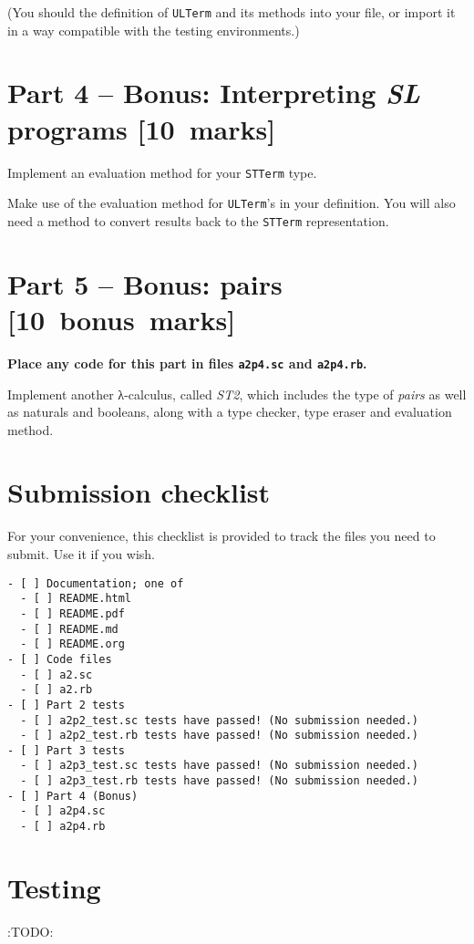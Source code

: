 \documentclass[11pt]{article}
\theoremstyle{definition}
\begin{document}
(You should the definition of \texttt{ULTerm} and its methods into your file,
or import it in a way compatible with the testing environments.)

\section*{Part 4 – Bonus: Interpreting \emph{SL} programs                     [10 marks]}
\label{sec:org5a3e0fd}
Implement an evaluation method for your \texttt{STTerm} type.

Make use of the evaluation method for \texttt{ULTerm}'s in your definition.
You will also need a method to convert results back
to the \texttt{STTerm} representation.

\section*{Part 5 – Bonus: pairs                                        [10 bonus marks]}
\label{sec:org3546d7a}
\begin{center}
\textbf{Place any code for this part in files \texttt{a2p4.sc} and \texttt{a2p4.rb}.}
\end{center}

Implement another λ-calculus, called \emph{ST2}, which includes
the type of \emph{pairs} as well as naturals and booleans,
along with a type checker, type eraser and evaluation method.

\section*{Submission checklist}
\label{sec:orgcb13380}
For your convenience, this checklist is provided
to track the files you need to submit.
Use it if you wish.
\begin{verbatim}
- [ ] Documentation; one of
  - [ ] README.html
  - [ ] README.pdf
  - [ ] README.md
  - [ ] README.org
- [ ] Code files
  - [ ] a2.sc
  - [ ] a2.rb
- [ ] Part 2 tests
  - [ ] a2p2_test.sc tests have passed! (No submission needed.)
  - [ ] a2p2_test.rb tests have passed! (No submission needed.)
- [ ] Part 3 tests
  - [ ] a2p3_test.sc tests have passed! (No submission needed.)
  - [ ] a2p3_test.rb tests have passed! (No submission needed.)
- [ ] Part 4 (Bonus)
  - [ ] a2p4.sc
  - [ ] a2p4.rb
\end{verbatim}

\section*{Testing}
\label{sec:org4b64888}
:TODO:
\end{document}
